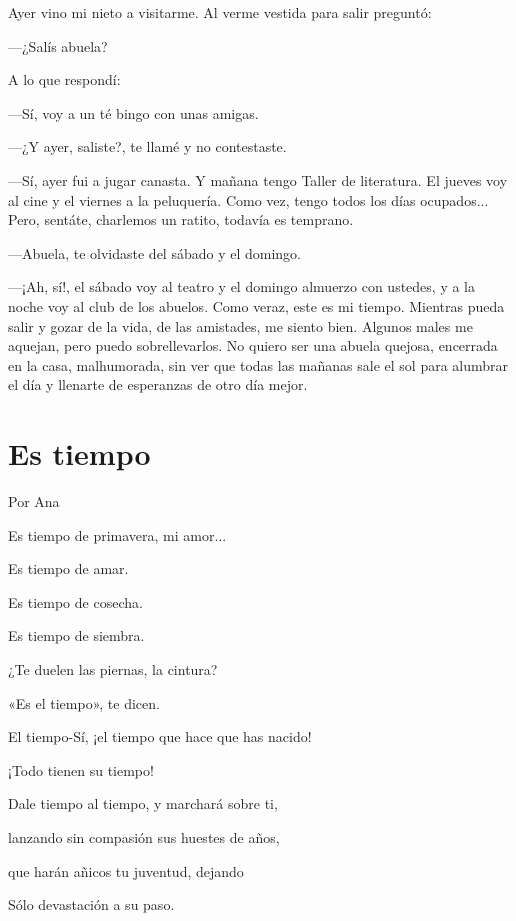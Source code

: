 \documentclass[11pt,twoside,openright,a5paper]{book}
\begin{document}
Ayer vino mi nieto a visitarme. Al verme vestida para salir preguntó:

---¿Salís abuela?

A lo que respondí: 

---Sí, voy a un té bingo con unas amigas.

---¿Y ayer, saliste?, te llamé y no contestaste.

---Sí, ayer fui a jugar canasta. Y mañana tengo Taller de literatura. El jueves voy al cine y el viernes a la peluquería. Como vez, tengo todos los días ocupados... Pero, sentáte, charlemos un ratito, todavía es temprano.

---Abuela, te olvidaste del sábado y el domingo.

---¡Ah, sí!, el sábado voy al teatro y el domingo almuerzo con ustedes, y a la noche voy al club de los abuelos. Como veraz, este es mi tiempo. Mientras pueda salir y gozar de la vida, de las amistades, me siento bien. Algunos males me aquejan, pero puedo sobrellevarlos. No quiero ser una abuela quejosa, encerrada en la casa, malhumorada, sin ver que todas las mañanas sale el sol para alumbrar el día y llenarte de esperanzas de otro día mejor.

\section*{Es tiempo}
                                                                                                        \begin{flushright}Por Ana\end{flushright}

Es tiempo de primavera, mi amor...

Es tiempo de amar.

Es tiempo de cosecha.

Es tiempo de siembra.

¿Te duelen las piernas, la cintura?

«Es el tiempo», te dicen.

El tiempo-Sí, ¡el tiempo que hace que has nacido!

¡Todo tienen su tiempo!

Dale tiempo al tiempo, y marchará sobre ti, 

lanzando sin compasión sus huestes de años,

que harán añicos tu juventud, dejando

Sólo devastación a su paso.
\end{document}
